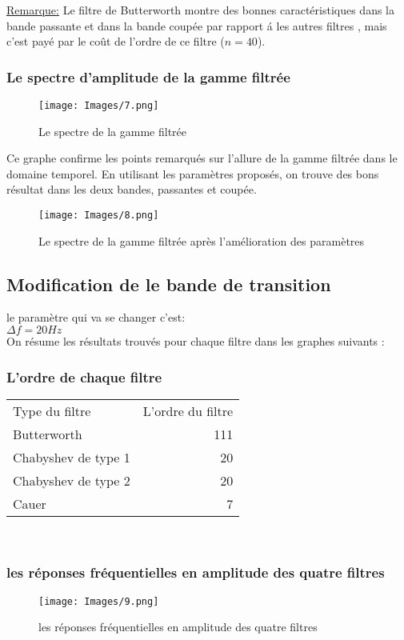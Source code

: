 \documentclass[twoside,twocolumn]{article}
\begin{document}
\underline{Remarque:}
Le filtre de Butterworth montre des bonnes	 caractéristiques dans la bande passante et dans la bande coupée par rapport á les autres filtres , mais c'est payé par le coût de l'ordre de ce filtre ($n=40$).

\subsubsection{Le spectre d'amplitude de la gamme filtrée}

\begin{figure}[H]
\centering
\texttt{[image: Images/7.png]}
\caption{ Le spectre de la gamme filtrée}
\end{figure}
Ce graphe confirme les points remarqués sur l'allure de la gamme filtrée dans le domaine temporel. 
En utilisant les paramètres proposés, on trouve des bons résultat dans les deux bandes, passantes et coupée.
\begin{figure}[H]
\centering
\texttt{[image: Images/8.png]}
\caption{ Le spectre de la gamme filtrée après l'amélioration des paramètres}
\end{figure}
\newpage
\subsection{Modification de le bande de transition}
le paramètre qui va se changer c'est:\\
 $\Delta f =20Hz$\\
On résume les résultats trouvés pour chaque filtre dans les graphes suivants :

\subsubsection{L'ordre de chaque filtre}

\begin{tabular}{l|r}
Type du filtre & L'ordre du filtre \\
Butterworth & 111 \\
Chabyshev de type 1 & 20\\
Chabyshev de type 2 & 20\\
Cauer &  7\\
\end{tabular}\\

\subsubsection{les réponses fréquentielles en amplitude des quatre filtres}
\begin{figure}[H]
\centering
\texttt{[image: Images/9.png]}
\caption{ les réponses fréquentielles en amplitude des quatre filtres}
\end{figure}
\end{document}

